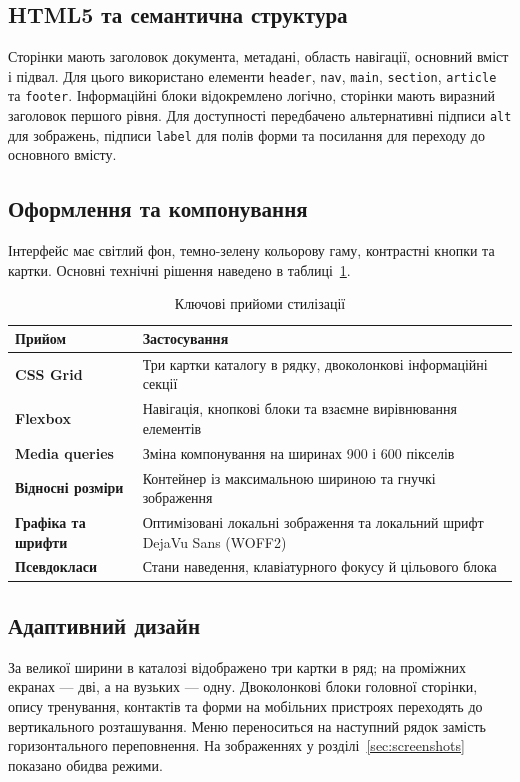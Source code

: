 \documentclass[12pt,a4paper]{article}
\newcommand{\file}[1]{\texttt{#1}}
\begin{document}
\subsection{HTML5 та семантична структура}
Сторінки мають заголовок документа, метадані, область навігації, основний вміст і підвал. Для цього використано елементи \file{header}, \file{nav}, \file{main}, \file{section}, \file{article} та \file{footer}. Інформаційні блоки відокремлено логічно, сторінки мають виразний заголовок першого рівня. Для доступності передбачено альтернативні підписи \file{alt} для зображень, підписи \file{label} для полів форми та посилання для переходу до основного вмісту.

\subsection{Оформлення та компонування}
Інтерфейс має світлий фон, темно-зелену кольорову гаму, контрастні кнопки та картки. Основні технічні рішення наведено в таблиці~\ref{tab:css}.
\begin{table}[H]
\centering
\caption{Ключові прийоми стилізації}\label{tab:css}
\noindent\begin{tabularx}{\textwidth}{>{\RaggedRight\arraybackslash\bfseries}p{40mm}X}
\toprule
Прийом & Застосування\\
\midrule
CSS Grid & Три картки каталогу в рядку, двоколонкові інформаційні секції\\
Flexbox & Навігація, кнопкові блоки та взаємне вирівнювання елементів\\
Media queries & Зміна компонування на ширинах 900 і 600 пікселів\\
Відносні розміри & Контейнер із максимальною шириною та гнучкі зображення\\
Графіка та шрифти & Оптимізовані локальні зображення та локальний шрифт DejaVu Sans (WOFF2)\\
Псевдокласи & Стани наведення, клавіатурного фокусу й цільового блока\\
\bottomrule
\end{tabularx}
\end{table}

\subsection{Адаптивний дизайн}
За великої ширини в каталозі відображено три картки в ряд; на проміжних екранах --- дві, а на вузьких --- одну. Двоколонкові блоки головної сторінки, опису тренування, контактів та форми на мобільних пристроях переходять до вертикального розташування. Меню переноситься на наступний рядок замість горизонтального переповнення. На зображеннях у розділі~\ref{sec:screenshots} показано обидва режими.
\end{document}
